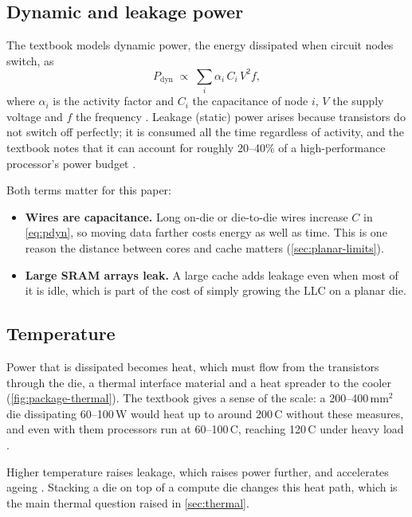 \subsection{Dynamic and leakage power}
\label{sec:power}

The textbook models dynamic power, the energy dissipated when circuit nodes switch, as
\begin{equation}
  P_{\mathrm{dyn}} \;\propto\; \sum_{i} \alpha_i\, C_i\, V^2 f,
  \label{eq:pdyn}
\end{equation}
where $\alpha_i$ is the activity factor and $C_i$ the capacitance of node $i$, $V$ the supply voltage and $f$ the frequency \cite[sec.~10.10.2]{sarangi2025basic}. Leakage (static) power arises because transistors do not switch off perfectly; it is consumed all the time regardless of activity, and the textbook notes that it can account for roughly 20--40\% of a high-performance processor's power budget \cite[sec.~10.10.3]{sarangi2025basic}.

Both terms matter for this paper:
\begin{itemize}
  \item \textbf{Wires are capacitance.} Long on-die or die-to-die wires increase $C$ in \cref{eq:pdyn}, so moving data farther costs energy as well as time. This is one reason the distance between cores and cache matters (\cref{sec:planar-limits}).
  \item \textbf{Large SRAM arrays leak.} A large cache adds leakage even when most of it is idle, which is part of the cost of simply growing the LLC on a planar die.
\end{itemize}

\subsection{Temperature}
Power that is dissipated becomes heat, which must flow from the transistors through the die, a thermal interface material and a heat spreader to the cooler \cite[sec.~10.10.1]{sarangi2025basic} (\cref{fig:package-thermal}). The textbook gives a sense of the scale: a 200--400\,mm$^2$ die dissipating 60--100\,W would heat up to around 200\,\textdegree C without these measures, and even with them processors run at 60--100\,\textdegree C, reaching 120\,\textdegree C under heavy load \cite[sec.~10.10.1]{sarangi2025basic}.


 Higher temperature raises leakage, which raises power further, and accelerates ageing \cite[sec.~10.10.1]{sarangi2025basic}. Stacking a die on top of a compute die changes this heat path, which is the main thermal question raised in \cref{sec:thermal}.

